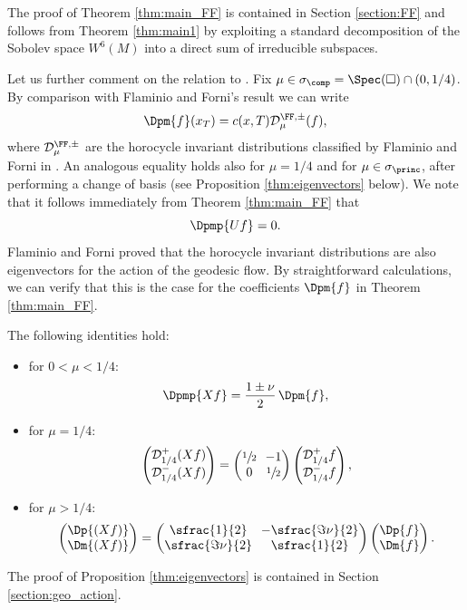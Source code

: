 The proof of Theorem \ref{thm:main_FF} is contained in Section \ref{section:FF} and follows from Theorem \ref{thm:main1} by exploiting a standard decomposition of the Sobolev space $W^6(M)$ into a direct sum of irreducible subspaces.

Let us further comment on the relation to \cite[Th.\,1.5]{FlaFo}. Fix $\mu \in \sigma_{\comp} = \Spec(\square) \cap (0,1/4)$.
By comparison with Flaminio and Forni's result we can write
\[
\Dpm{f}(x_T) = c(x,T) \mathcal{D}^{\FF, \pm}_\mu (f),
\]
where $\mathcal{D}^{\FF, \pm}_\mu$ are the horocycle invariant distributions classified by Flaminio and Forni in \cite{FlaFo}.
An analogous equality holds also for $\mu = 1/4$ and for $\mu \in \sigma_{\princ}$, after performing a change of basis (see Proposition \ref{thm:eigenvectors} below). We note that it follows immediately from Theorem \ref{thm:main_FF} that
\[
\Dpmp{Uf} =0.
\]
Flaminio and Forni proved that the horocycle invariant distributions are also eigenvectors for the action of the geodesic flow. By straightforward calculations, we can verify that this is the case for the coefficients $\Dpm{f}$ in Theorem \ref{thm:main_FF}.

\begin{proposition}\label{thm:eigenvectors}
The following identities hold:
\begin{itemize}
\item for $0<\mu< 1/4$:
\[
\Dpmp{Xf} = \frac{1\pm \nu}{2}\, \Dpm{f},
\]
\item for $\mu=1/4$:
\[\arraycolsep3.5pt
\begin{pmatrix}
\mathcal{D}^{+}_{1/4}(Xf) \\
\mathcal{D}^{-}_{1/4}(Xf)
\end{pmatrix}
=
\begin{pmatrix}
\sfrac{1}{2} & -1 \\
0 & \sfrac{1}{2}
\end{pmatrix}
\begin{pmatrix}
\mathcal{D}^{+}_{1/4}f \\
\mathcal{D}^{-}_{1/4}f
\end{pmatrix},
\]
\item for $\mu > 1/4$:
\[\arraycolsep3.5pt
\begin{pmatrix}
\Dp{(Xf)} \\
\Dm{(Xf)}
\end{pmatrix}
=
\begin{pmatrix}
\sfrac{1}{2} & -\sfrac{\Im \nu}{2} \\
\sfrac{\Im \nu}{2} & \sfrac{1}{2}
\end{pmatrix}
\begin{pmatrix}
\Dp{f} \\
\Dm{f}
\end{pmatrix}.
\]
\end{itemize}
\end{proposition}
The proof of Proposition \ref{thm:eigenvectors} is contained in Section \ref{section:geo_action}.

